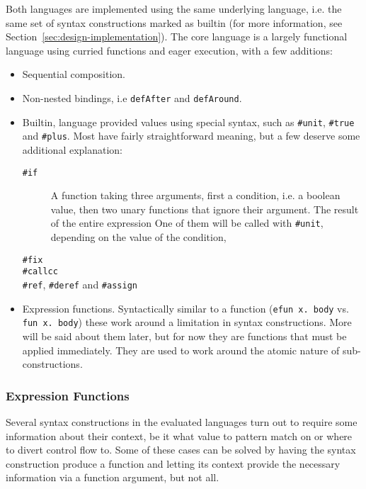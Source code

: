 \documentclass{kththesis}
\begin{document}
Both languages are implemented using the same underlying language, i.e. the same set of syntax constructions marked as builtin (for more information, see Section~\ref{sec:design-implementation}). The core language is a largely functional language using curried functions and eager execution, with a few additions:
\begin{itemize}
  \item Sequential composition.
  \item Non-nested bindings, i.e \texttt{defAfter} and \texttt{defAround}. %
  \item Builtin, language provided values using special syntax, such as \texttt{#unit}, \texttt{#true} and \texttt{#plus}. Most have fairly straightforward meaning, but a few deserve some additional explanation:
  \begin{description}
    \item[\texttt{#if}] A function taking three arguments, first a condition, i.e. a boolean value, then two unary functions that ignore their argument. The result of the entire expression One of them will be called with \texttt{#unit}, depending on the value of the condition, %
    \item[\texttt{#fix}]
    \item[\texttt{#callcc}]
    \item[\texttt{#ref}, \texttt{#deref} and \texttt{#assign}]
  \end{description}
  \item Expression functions. Syntactically similar to a function (\texttt{efun x. body} vs. \texttt{fun x. body}) these work around a limitation in syntax constructions. More will be said about them later, but for now they are functions that must be applied immediately. They are used to work around the atomic nature of sub-constructions.
\end{itemize}

\subsubsection{Expression Functions} \label{sec:efun-drawbacks}

Several syntax constructions in the evaluated languages turn out to require some information about their context, be it what value to pattern match on or where to divert control flow to. Some of these cases can be solved by having the syntax construction produce a function and letting its context provide the necessary information via a function argument, but not all.
\end{document}
